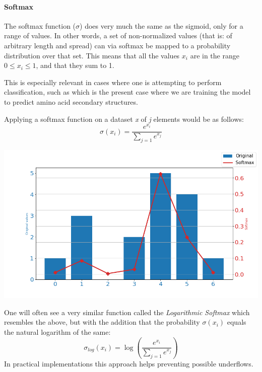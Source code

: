 \begin{multicols}{2}


\paragraph{Softmax}
The softmax function ($\sigma$) does very much the same as the sigmoid, only for a range of values. In other words, a set of non-normalized values (that is: of arbitrary length and spread) can via softmax be mapped to a probability distribution over that set. This means that all the values $x_i$ are in the range $0\leq x_i \leq 1$, and that they sum to 1.

This is especially relevant in cases where one is attempting to perform classification, such as which is the present case where we are training the model to predict amino acid secondary structures. 

Applying a softmax function on a dataset \textit{x} of \textit{j} elements would be as follows:
$$
\sigma(x_i) = \frac{e^{x_i}}{\sum_{j=1} e^{x_j}}
$$

\begin{Figure}
 \centering
 \includegraphics[width=\linewidth]{../graphs/softmax}
 \captionsetup{width=0.8\linewidth, font=small}
\end{Figure}
One will often see a very similar function called the \textit{Logarithmic Softmax} which resembles the above, but with the addition that the probability $\sigma(x_i)$ equals the natural logarithm of the same:
\[
\sigma_{log}\left(x_{i}\right)=\log \left(\frac{e^{ x_{i}}}{\sum_{j=1} e^{ x_{j}}}\right)
\]
In practical implementations this approach helps preventing possible underflows.


\end{multicols}
